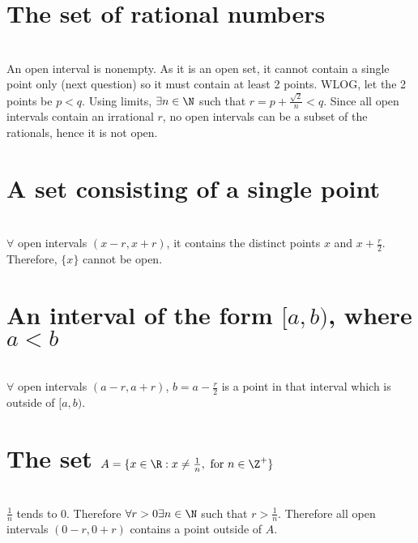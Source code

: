 \begin{parts}
 
 \part{The set of rational numbers}
 
 
\begin{solution}
 \\An open interval is nonempty. As it is an open set, it cannot contain a single point only (next question) so it must contain at least 2 points. WLOG, let the 2 points be $p < q$. Using limits, $\exists n \in \N$ such that $r = p + \frac{\sqrt{2}}{n} < q$. Since all open intervals contain an irrational $r$, no open intervals can be a subset of the rationals, hence it is not open.
\end{solution}

 \part{A set consisting of a single point}
 
 
\begin{solution}
 \\$\forall$ open intervals $(x-r,x+r)$, it contains the distinct points $x$ and $x+\frac{r}{2}$. Therefore, $\{x\}$ cannot be open.
\end{solution}

 \part{An interval of the form $[a,b)$, where $a < b$}
 
 
\begin{solution}
\\ $\forall$ open intervals $(a-r,a+r)$, $b=a-\frac{r}{2}$ is a point in that interval which is outside of $[a,b)$.
\end{solution}

 \part{The set $A = \{x\in\R:x\neq\frac{1}{n},\text{ for }n\in\Z^+\}$}
 
 
\begin{solution}
\\ $\frac{1}{n}$ tends to 0. Therefore $\forall r > 0 \exists n \in \N$ such that $r > \frac{1}{n}$. Therefore all open intervals $(0-r,0+r)$ contains a point outside of $A$.
\end{solution}
\end{parts}

